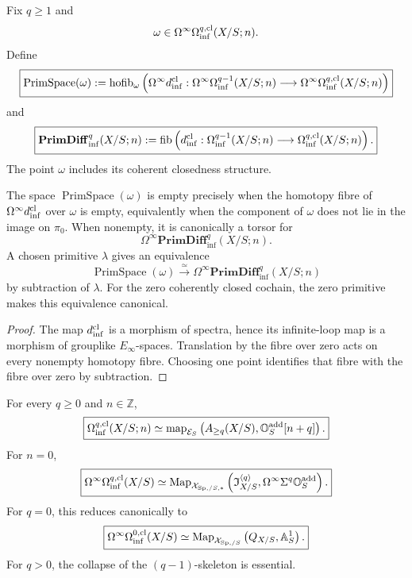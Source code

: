 \begin{definition}
\label{def:modal-form-primitive-spectrum}
Fix \(q\geq1\) and
\[
    \omega\in
    \Omega^\infty\Omega_{\mathrm{inf}}^{q,\mathrm{cl}}(X/S;n).
\]
Define
\[
\boxed{
    \operatorname{PrimSpace}(\omega)
    :=
    \operatorname{hofib}_{\omega}
    \left(
        \Omega^\infty d_{\inf}^{\mathrm{cl}}:
        \Omega^\infty\Omega_{\mathrm{inf}}^{q-1}(X/S;n)
        \longrightarrow
        \Omega^\infty\Omega_{\mathrm{inf}}^{q,\mathrm{cl}}(X/S;n)
    \right)
}
\]
and
\[
\boxed{
    \mathbf{PrimDiff}_{\inf}^q(X/S;n)
    :=
    \operatorname{fib}
    \left(
        d_{\inf}^{\mathrm{cl}}:
        \Omega_{\mathrm{inf}}^{q-1}(X/S;n)
        \longrightarrow
        \Omega_{\mathrm{inf}}^{q,\mathrm{cl}}(X/S;n)
    \right).
}
\]
The point \(\omega\) includes its coherent closedness structure.
\end{definition}

\begin{theorem}
\label{thm:modal-form-primitive-torsor}
The space \(\operatorname{PrimSpace}(\omega)\) is empty precisely when the homotopy fibre of
\(\Omega^\infty d_{\inf}^{\mathrm{cl}}\) over \(\omega\) is empty, equivalently when the component of
\(\omega\) does not lie in the image on \(\pi_0\).  When nonempty, it is canonically a torsor for
\[
    \Omega^\infty\mathbf{PrimDiff}_{\inf}^q(X/S;n).
\]
A chosen primitive \(\lambda\) gives an equivalence
\[
    \operatorname{PrimSpace}(\omega)
    \xrightarrow{\simeq}
    \Omega^\infty\mathbf{PrimDiff}_{\inf}^q(X/S;n)
\]
by subtraction of \(\lambda\).  For the zero coherently closed cochain, the zero primitive makes this
equivalence canonical.
\end{theorem}

\begin{proof}
The map \(d_{\inf}^{\mathrm{cl}}\) is a morphism of spectra, hence its infinite-loop map is a morphism of
grouplike \(E_\infty\)-spaces.  Translation by the fibre over zero acts on every nonempty homotopy
fibre.  Choosing one point identifies that fibre with the fibre over zero by subtraction.
\end{proof}

\begin{theorem}
\label{thm:additive-delooping-classifier}
For every \(q\geq0\) and \(n\in\mathbb Z\),
\[
\boxed{
    \Omega_{\mathrm{inf}}^{q,\mathrm{cl}}(X/S;n)
    \simeq
    \operatorname{map}_{\mathcal E_S}
    \left(
        A_{\geq q}(X/S),
        \mathbb O_S^{\mathrm{add}}[n+q]
    \right).
}
\]
For \(n=0\),
\[
\boxed{
    \Omega^\infty\Omega_{\mathrm{inf}}^{q,\mathrm{cl}}(X/S)
    \simeq
    \operatorname{Map}_{\mathcal X_{\mathrm{Sp},/S,*}}
    \left(
        \mathfrak I^{\langle q\rangle}_{X/S},
        \Omega^\infty\Sigma^q\mathbb O_S^{\mathrm{add}}
    \right).
}
\]
For \(q=0\), this reduces canonically to
\[
\boxed{
    \Omega^\infty\Omega_{\mathrm{inf}}^{0,\mathrm{cl}}(X/S)
    \simeq
    \operatorname{Map}_{\mathcal X_{\mathrm{Sp},/S}}
    \left(
        Q_{X/S},
        \mathbb A^1_S
    \right).
}
\]
For \(q>0\), the collapse of the \((q-1)\)-skeleton is essential.
\end{theorem}

